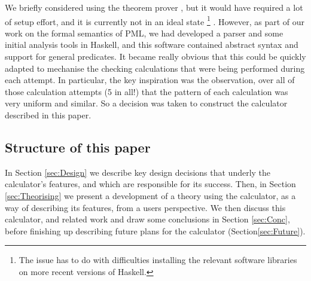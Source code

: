 We briefly considered using the  theorem prover
\cite{DBLP:conf/utp/Butterfield10,DBLP:conf/utp/Butterfield12},
but it would have required a lot of setup effort,
and it is currently not in an ideal state%
\footnote{The issue has to do with difficulties installing
the relevant software libraries
on more recent versions of Haskell.}
.
However, as part of our work on the formal semantics of PML,
we had developed a parser and some initial analysis tools
in Haskell\cite{Haskell2010},
and this software contained abstract syntax and support
for general predicates.
It became really obvious that this could be quickly adapted
to mechanise the checking calculations that were being performed
during each attempt.
In particular,
the key inspiration was the observation,
over all of those calculation attempts (5 in all!)
that the pattern of each calculation was very uniform and similar.
So a decision was taken to construct the calculator described in this paper.



\subsection{Structure of this paper}

In Section \ref{sec:Design}
we describe key design decisions
that underly the calculator's features,
and which are responsible for its success.
Then, in Section \ref{sec:Theorising}
we present a development of a theory using the calculator,
as a way of describing its features, from a users perspective.
We then discuss this calculator, and related work
and draw some conclusions in Section \ref{sec:Conc},
before finishing up describing future plans for the calculator
(Section\ref{sec:Future}).

